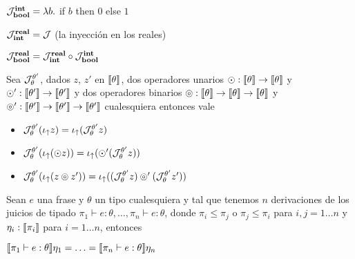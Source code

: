 $\mathcal{J}_{\textbf{bool}}^{\textbf{int}} = \lambda b .$ if $b$ then $0$ else $1$\\
\indent

$\mathcal{J}_{\textbf{int}}^{\textbf{real}} = \mathcal{J}$ (la inyecci\'on en los reales)\\
\indent

$\mathcal{J}_{\textbf{bool}}^{\textbf{real}} = \mathcal{J}_{\textbf{int}}^{\textbf{real}} \circ \mathcal{J}_{\textbf{bool}}^{\textbf{int}}$\\

\begin{proposition}
Sea $\mathcal{J}_{\theta}^{\theta'}$, dados $z$, $z'$ en $\llbracket \theta \rrbracket$, dos operadores
unarios $\odot : \llbracket \theta \rrbracket \rightarrow \llbracket \theta \rrbracket$ y 
$\odot' : \llbracket \theta' \rrbracket \rightarrow \llbracket \theta' \rrbracket$ y dos operadores
binarios $\circledcirc : \llbracket \theta \rrbracket \rightarrow 
		\llbracket \theta \rrbracket \rightarrow \llbracket \theta \rrbracket$ y
$\circledcirc' : \llbracket \theta' \rrbracket \rightarrow 
		\llbracket \theta' \rrbracket \rightarrow \llbracket \theta' \rrbracket$
cualesquiera entonces vale

\begin{itemize}
\item $\mathcal{J}_{\theta}^{\theta'} (\iota_{\uparrow} z) = \iota_{\uparrow} (\mathcal{J}_{\theta}^{\theta'} z)$
\item $\mathcal{J}_{\theta}^{\theta'} (\iota_{\uparrow} (\odot z)) = \iota_{\uparrow} (\odot' (\mathcal{J}_{\theta}^{\theta'} z))$
\item $\mathcal{J}_{\theta}^{\theta'} (\iota_{\uparrow} (z \circledcirc z')) = 
	   \iota_{\uparrow} ((\mathcal{J}_{\theta}^{\theta'} z) \circledcirc' (\mathcal{J}_{\theta}^{\theta'} z'))$

\end{itemize}

\end{proposition}


\begin{theorem}[De coherencia]
Sean $e$ una frase y $\theta$ un tipo cualesquiera y tal que tenemos 
$n$ derivaciones de los juicios de tipado
$\pi_1 \vdash e : \theta, \ldots, \pi_n \vdash e : \theta$, donde
$\pi_i \leq \pi_j$ o $\pi_j \leq \pi_i$ para $i,j = 1 \ldots n$ y
$\eta_i : \llbracket \pi_i \rrbracket$ para $i = 1 \ldots n$, entonces

\begin{center}
$\llbracket \pi_1 \vdash e : \theta \rrbracket\eta_1 = \ldots = \llbracket \pi_n \vdash e : \theta \rrbracket\eta_n$
\end{center}

\end{theorem}

